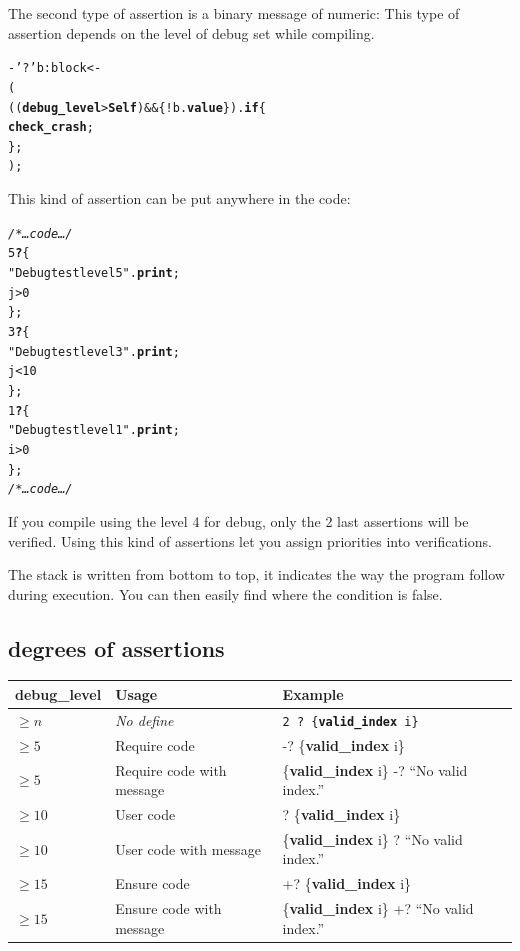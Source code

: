 \documentclass[11pt]{mybook}
\begin{document}
The second type of assertion is a binary message of {\sc{}numeric}:
This type of assertion depends on the level of debug set while compiling.
\begin{alltt}
  - '?' b:{\sc{}block} <- 
    (
     (({\bf{}debug\_level} > {\bf{}Self}) && \{! b.{\bf{}value} \}).{\bf{}if} \{ 
       {\bf{}check\_crash}; 
     \};
    );
\end{alltt}
This kind of assertion can be put anywhere in the code:
\begin{alltt}
  {\it{}/* \ldots code \ldots */}
  5 {\bf{}?} \{
      "Debug test level 5".{\bf{}print};
      j > 0
   \};
  3 {\bf{}?} \{
      "Debug test level 3".{\bf{}print};
      j < 10
   \};
  1 {\bf{}?} \{
      "Debug test level 1".{\bf{}print};
      i > 0
   \};
  {\it{}/* \ldots code \ldots */}
\end{alltt}
If you compile using the level 4 for debug, only the 2 last assertions will be verified. Using this kind of assertions let you assign priorities into verifications.

The stack is written from bottom to top, it indicates the way the program follow during execution.
You can then easily find where the condition is false.

\subsection{degrees of assertions}
\label{language_reference:contract:requires_and_ensures}

\begin{tabularx}{\textwidth}{l l X}
\hline
{\bf{}debug\_level} & {\bf{}Usage} & {\bf{}Example} \\
\hline
\hline
{$\geq n$}    & {\it{}No define           } & {\tt{}2 ? \{{\bf{}valid\_index} i\}} \\
\hline
{$\geq 5$}  & {Require code             } & { -? \{{\bf{}valid\_index} i\}} \\
{$\geq 5$}  & {Require code with message} & { \{{\bf{}valid\_index} i\} -? ``No valid index.'' } \\
\hline
{$\geq 10$} & {User code                } & { ? \{{\bf{}valid\_index} i\}} \\
{$\geq 10$} & {User code with message   } & { \{{\bf{}valid\_index} i\} ? ``No valid index.'' } \\
\hline
{$\geq 15$} & {Ensure code              } & { +? \{{\bf{}valid\_index} i\}} \\
{$\geq 15$} & {Ensure code with message } & { \{{\bf{}valid\_index} i\} +? ``No valid index.'' } \\
\hline
\end{tabularx}
\end{document}
